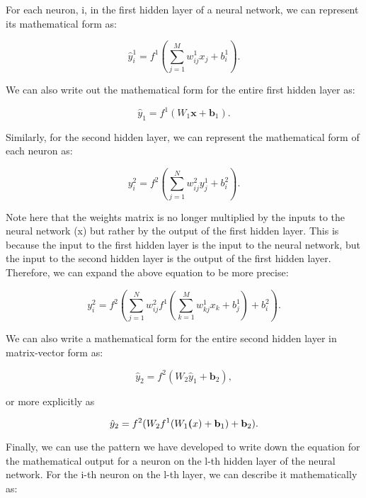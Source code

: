 		For each neuron, i, in the first hidden layer of a neural network, we can represent its mathematical form as:

		\begin{equation}\label{first_hidden_layer}
			\hat{y}_i^1 = f^1(\sum_{j=1}^M w_{ij}^1x_j + b_i^1).
		\end{equation}

		We can also write out the mathematical form for the entire first hidden layer as:

		\begin{equation}\label{first_hidden_layer_mv}
			\hat{y}_1 = f^1(W_1\textbf{x} + \textbf{b}_1).
		\end{equation}

		Similarly, for the second hidden layer, we can represent the mathematical form of each neuron as:

		\begin{equation}\label{second_hidden_layer}
			y_i^2 = f^2(\sum_{j=1}^N w_{ij}^2y_j^1 + b_i^2).
		\end{equation}

		Note here that the weights matrix is no longer multiplied by the inputs to the neural network (x) but rather by the output of the first hidden layer. This is because the input to the first hidden layer is the input to the neural network, but the input to the second hidden layer is the output of the first hidden layer. Therefore, we can expand the above equation to be more precise:

		\begin{equation}\label{second_hidden_layer_expanded}
			y_i^2 = f^2(\sum_{j=1}^N w_{ij}^2f^1(\sum_{k=1}^M w_{kj}^1x_k + b_j^1) + b_i^2).
		\end{equation}

		We can also write a mathematical form for the entire second hidden layer in matrix-vector form as:

		\begin{equation}\label{second_hidden_layer_mv}
			\hat{y}_2 = f^2(W_2\hat{y}_1 + \textbf{b}_2),
		\end{equation}

		or more explicitly as

		\begin{equation}\label{second_hidden_layer_mv_expanded}
			\hat{y}_2 = f^2(W_2f^1(W_1\textbf(x) + \textbf{b}_1) + \textbf{b}_2).
		\end{equation}

		Finally, we can use the pattern we have developed to write down the equation for the mathematical output for a neuron on the l-th hidden layer of the neural network. For the i-th neuron on the l-th layer, we can describe it mathematically as:

